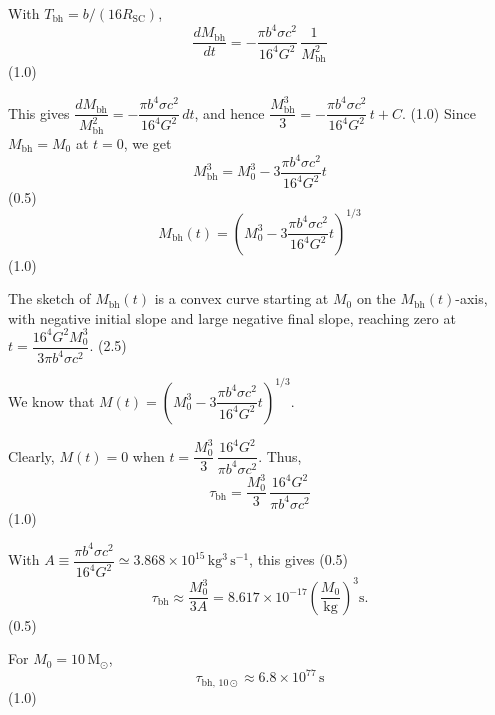 \begin{description}
  With $T_{\mathrm{bh}} = b/(16 R_{\mathrm{SC}})$,
  \[
    \frac{dM_{\mathrm{bh}}}{dt}
    = -\frac{\pi b^4 \sigma c^2}{16^4 G^2}\,\frac{1}{M_{\mathrm{bh}}^2}
  \]
  \hfill(1.0)

  This gives
  $\dfrac{dM_{\mathrm{bh}}}{M_{\mathrm{bh}}^{2}}
  = -\dfrac{\pi b^4 \sigma c^2}{16^4 G^2}\,dt$,
  and hence
  $\dfrac{M_{\mathrm{bh}}^3}{3}
  = -\dfrac{\pi b^4 \sigma c^2}{16^4 G^2}\,t + C$. \hfill(1.0)
  Since $M_{\mathrm{bh}} = M_0$ at $t = 0$, we get
  \[
    M_{\mathrm{bh}}^3 = M_0^3 - 3\frac{\pi b^4 \sigma c^2}{16^4 G^2} t
  \]
  \hfill(0.5)
  \[
    M_{\mathrm{bh}}(t)
    = \left(M_0^3 - 3\frac{\pi b^4 \sigma c^2}{16^4 G^2} t\right)^{1/3}
  \]
  \hfill(1.0)

  The sketch of $M_{\mathrm{bh}}(t)$ is a convex curve starting at $M_0$ on
  the $M_{\mathrm{bh}}(t)$-axis, with negative initial slope and large
  negative final slope, reaching zero at
  $t = \dfrac{16^4 G^2 M_0^3}{3\pi b^4 \sigma c^2}$. \hfill(2.5)

\item[(T12.1d)] We know that
  $M(t) = \left(M_0^3 - 3\dfrac{\pi b^4 \sigma c^2}{16^4 G^2}
  t\right)^{1/3}$.

  Clearly, $M(t) = 0$ when
  $t = \dfrac{M_0^3}{3}\,\dfrac{16^4 G^2}{\pi b^4 \sigma c^2}$. Thus,
  \[
    \tau_{\mathrm{bh}} = \frac{M_0^3}{3}\,
      \frac{16^4 G^2}{\pi b^4 \sigma c^2}
  \]
  \hfill(1.0)

  With $A \equiv \dfrac{\pi b^4 \sigma c^2}{16^4 G^2}
  \simeq 3.868 \times 10^{15}\,\mathrm{kg^3\,s^{-1}}$, this gives \hfill(0.5)
  \[
    \tau_{\mathrm{bh}} \approx \frac{M_0^3}{3A}
    = 8.617 \times 10^{-17} \left(\frac{M_0}{\mathrm{kg}}\right)^3
    \mathrm{s}.
  \]
  \hfill(0.5)

  For $M_0 = 10\,\mathrm{M_\odot}$,
  \[
    \tau_{\mathrm{bh,\,10\odot}} \approx 6.8 \times 10^{77}\,\mathrm{s}
  \]
  \hfill(1.0)


\end{description}
